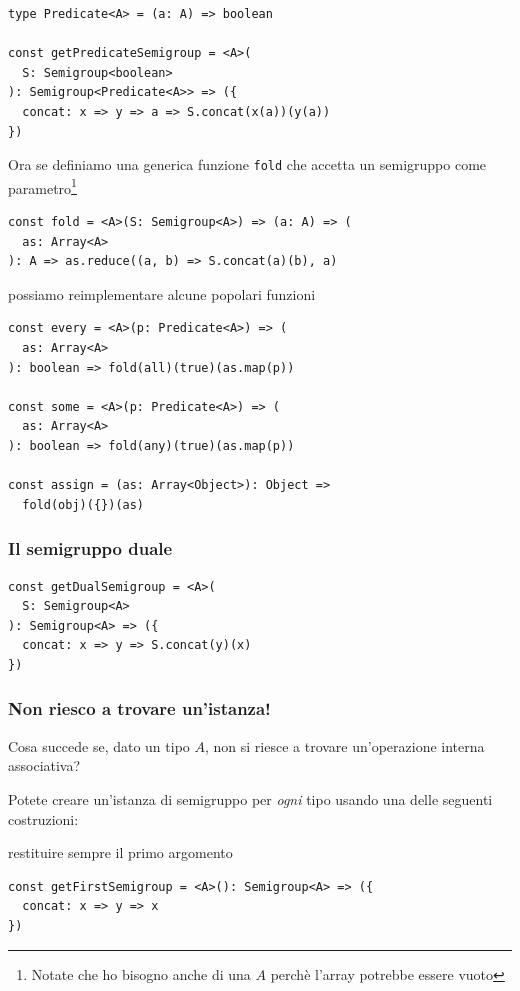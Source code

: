 \documentclass[12pt]{article}
\begin{document}
\begin{verbatim}
type Predicate<A> = (a: A) => boolean

const getPredicateSemigroup = <A>(
  S: Semigroup<boolean>
): Semigroup<Predicate<A>> => ({
  concat: x => y => a => S.concat(x(a))(y(a))
})
\end{verbatim}

Ora se definiamo una generica funzione \texttt{fold} che accetta un semigruppo come parametro\footnote{Notate che ho bisogno anche di una $A$ perchè l'array potrebbe essere vuoto}

\begin{verbatim}
const fold = <A>(S: Semigroup<A>) => (a: A) => (
  as: Array<A>
): A => as.reduce((a, b) => S.concat(a)(b), a)
\end{verbatim}

possiamo reimplementare alcune popolari funzioni

\begin{verbatim}
const every = <A>(p: Predicate<A>) => (
  as: Array<A>
): boolean => fold(all)(true)(as.map(p))

const some = <A>(p: Predicate<A>) => (
  as: Array<A>
): boolean => fold(any)(true)(as.map(p))

const assign = (as: Array<Object>): Object =>
  fold(obj)({})(as)
\end{verbatim}

\subsubsection{Il semigruppo duale}

\begin{verbatim}
const getDualSemigroup = <A>(
  S: Semigroup<A>
): Semigroup<A> => ({
  concat: x => y => S.concat(y)(x)
})
\end{verbatim}

\subsubsection{Non riesco a trovare un'istanza!}

Cosa succede se, dato un tipo $A$, non si riesce a trovare un'operazione interna associativa?

Potete creare un'istanza di semigruppo per \emph{ogni} tipo usando una delle seguenti costruzioni:

restituire sempre il primo argomento

\begin{verbatim}
const getFirstSemigroup = <A>(): Semigroup<A> => ({
  concat: x => y => x
})
\end{verbatim}
\end{document}
